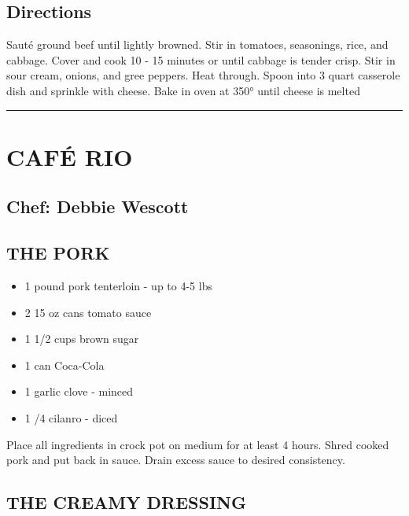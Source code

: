 \documentclass[
]{book}
\providecommand{\tightlist}{%
  \setlength{\itemsep}{0pt}\setlength{\parskip}{0pt}}
\begin{document}
\hypertarget{directions-45}{%
\subsection*{Directions}\label{directions-45}}


Sauté ground beef until lightly browned. Stir in tomatoes, seasonings, rice, and cabbage. Cover and cook 10 - 15 minutes or until cabbage is tender crisp. Stir in sour cream, onions, and gree peppers. Heat through. Spoon into 3 quart casserole dish and sprinkle with cheese. Bake in oven at 350° until cheese is melted

\begin{center}\rule{0.5\linewidth}{0.5pt}\end{center}

\hypertarget{cafuxe9-rio}{%
\section*{CAFÉ RIO}\label{cafuxe9-rio}}


\hypertarget{chef-debbie-wescott-2}{%
\subsection*{Chef: Debbie Wescott}\label{chef-debbie-wescott-2}}


\hypertarget{the-pork}{%
\subsection*{THE PORK}\label{the-pork}}


\begin{itemize}
\tightlist
\item
  1 pound pork tenterloin - up to 4-5 lbs
\item
  2 15 oz cans tomato sauce
\item
  1 1/2 cups brown sugar
\item
  1 can Coca-Cola
\item
  1 garlic clove - minced
\item
  1 /4 cilanro - diced
\end{itemize}

Place all ingredients in crock pot on medium for at least 4 hours. Shred cooked pork and put back in sauce. Drain excess sauce to desired consistency.

\hypertarget{the-creamy-dressing}{%
\subsection*{THE CREAMY DRESSING}\label{the-creamy-dressing}}
\end{document}
